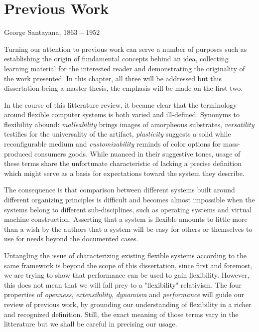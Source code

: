 \chapter{Previous Work}
{George Santayana, $1863-1952$}

Turning our attention to previous work can serve a number of purposes such as
establishing the origin of fundamental concepts behind an idea, collecting
learning material for the interested reader and demonstrating the originality
of the work presented. In this chapter, all three will be addressed but this
dissertation being a master thesis, the emphasis will be made on the first two. 

In the course of this litterature review, it became clear that the
terminology around flexible computer systems is both varied and ill-defined.
Synonyms to flexibility abound: \textit{malleability} brings images of
amorpheous substrates, \textit{versatility} testifies for the universality of
the artifact, \textit{plasticity} suggests a solid while reconfigurable medium
and \textit{customizability} reminds of color options for mass-produced
consumers goods. While nuanced in their suggestive tones, usage of these terms
share the unfortunate characteristic of lacking a precise definition which
might serve as a basis for expectations toward the system they describe.

The consequence is that comparison between different systems built around
different organizing principles is difficult and becomes almost impossible when
the systems belong to different sub-disciplines, such as operating systems and
virtual machine construction. Asserting that a system is flexible amounts to
little more than a wish by the authors that a system will be easy for others or
themselves to use for needs beyond the documented cases.  

Untangling the issue of characterizing existing flexible systems according to
the same framework is beyond the scope of this dissertation, since first and
foremost, we are trying to show that performance can be used to gain
flexibility. However, this does not mean that we will fall prey to a
"flexibility" relativism. The four properties of \textit{openness},
\textit{extensibility}, \textit{dynamism} and \textit{performance} will guide
our review of previous work, by grounding our understanding of flexibility in a
richer and recognized definition. Still, the exact meaning of those terms vary
in the litterature but we shall be careful in precising our usage.


